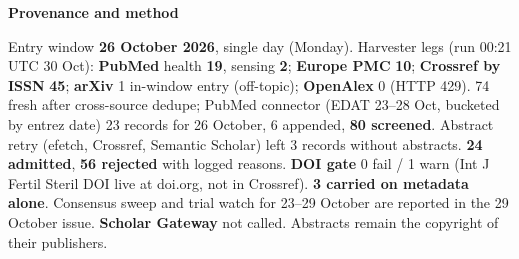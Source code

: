 \documentclass[10pt]{article}
\begin{document}
\begin{keybox}
{\sffamily\bfseries\footnotesize\color{Deep}Provenance and method}\\[1.2mm]
{\fontsize{7.2}{8.8}\selectfont
Entry window \textbf{26 October 2026}, single day (Monday). Harvester legs (run 00:21 UTC 30 Oct): \textbf{PubMed}
health \textbf{19}, sensing \textbf{2}; \textbf{Europe PMC} \textbf{10}; \textbf{Crossref by ISSN} \textbf{45};
\textbf{arXiv} 1 in-window entry (off-topic); \textbf{OpenAlex} 0 (HTTP 429). 74 fresh after cross-source dedupe; PubMed
connector (EDAT 23--28 Oct, bucketed by entrez date) 23 records for 26 October, 6 appended, \textbf{80 screened}.
Abstract retry (efetch, Crossref, Semantic Scholar) left 3 records without abstracts. \textbf{24 admitted},
\textbf{56 rejected} with logged reasons. \textbf{DOI gate} 0 fail / 1 warn (Int J Fertil Steril DOI live at doi.org, not
in Crossref). \textbf{3 carried on metadata alone}. Consensus sweep and trial watch for 23--29 October are reported in
the 29 October issue. \textbf{Scholar Gateway} not called. Abstracts remain the copyright of their publishers.\par}
\end{keybox}
\end{document}
